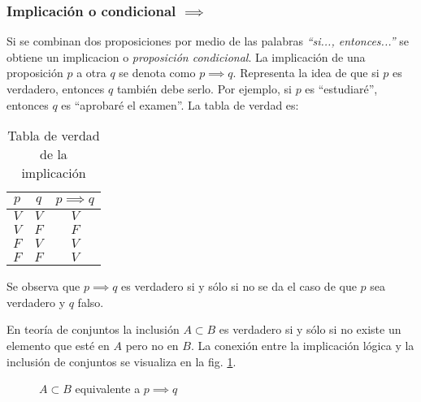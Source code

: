 \subsubsection{Implicación o condicional $\implies$}  
Si se combinan dos proposiciones por medio de las palabras \textit{``si..., entonces...''} se obtiene un \gls{implicacion} o \textit{proposición condicional}. La implicación de una proposición $p$ a otra $q$ se denota como $p \implies q$. Representa la idea de que si $p$ es verdadero, entonces $q$ también debe serlo. Por ejemplo, si $p$ es ``estudiaré'', entonces $q$ es ``aprobaré el examen''. La tabla de verdad es:

\begin{table}[H]
	\centering
	\begin{tabular}{|c|c|c|} \hline
		$p$ & $q$ & $p \implies q$ \\ \hline
		$V$ & $V$ & $V$ \\
		$V$ & $F$ & $F$ \\
		$F$ & $V$ & $V$ \\
		$F$ & $F$ & $V$ \\ \hline
	\end{tabular}
	\caption{Tabla de verdad de la implicación}
	\label{tab:implicacion}
\end{table}

Se observa que $p \implies q$ es verdadero si y sólo si no se da el caso de que $p$ sea verdadero y $q$ falso.

En teoría de conjuntos la inclusión $A \subset B$ es verdadero si y sólo si no existe un elemento que esté en $A$ pero no en $B$. La conexión entre la implicación lógica y la inclusión de conjuntos se visualiza en la fig. \ref{fig:inclusion_logica}.

\begin{figure}[H]
	\centering
	\caption{$A \subset B$ equivalente a $p \implies q$}
	\label{fig:inclusion_logica}
\end{figure}

